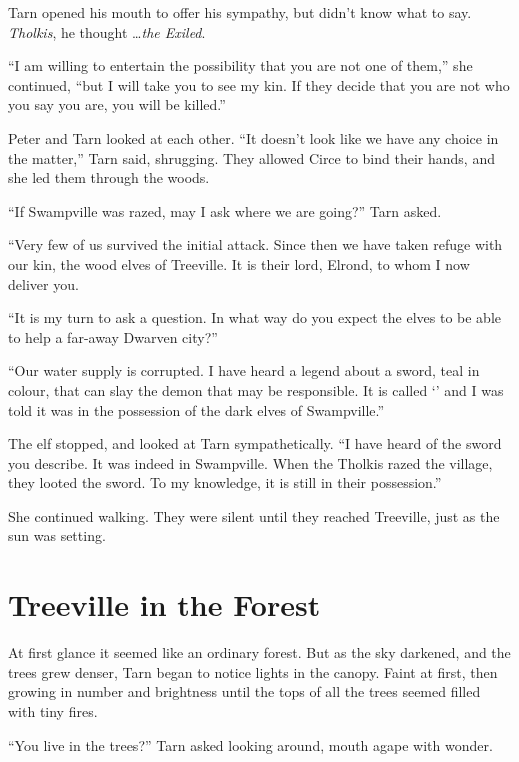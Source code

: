 Tarn opened his mouth to offer his sympathy, but didn't know what to say.  \emph{Tholkis}, he thought \ldots \emph{the Exiled}.

``I am willing to entertain the possibility that you are not one of them,'' she continued, ``but I will take you to see my kin.  If they decide that you are not who you say you are, you will be killed.''

Peter and Tarn looked at each other.  ``It doesn't look like we have any choice in the matter,'' Tarn said, shrugging.  They allowed Circe to bind their hands, and she led them through the woods.

``If Swampville was razed, may I ask where we are going?'' Tarn asked.

``Very few of us survived the initial attack.  Since then we have taken refuge with our kin, the wood elves of Treeville.  It is their lord, Elrond, to whom I now deliver you.

``It is my turn to ask a question.  In what way do you expect the elves to be able to help a far-away Dwarven city?''

``Our water supply is corrupted.  I have heard a legend about a sword, teal in colour, that can slay the demon that may be responsible.  It is called `\kildir' and I was told it was in the possession of the dark elves of Swampville.''

The elf stopped, and looked at Tarn sympathetically.  ``I have heard of the sword you describe.  It was indeed in Swampville.  When the Tholkis razed the village, they looted the sword.  To my knowledge, it is still in their possession.''

She continued walking.  They were silent until they reached Treeville, just as the sun was setting.

\chapter{Treeville in the Forest}

At first glance it seemed like an ordinary forest.  But as the sky darkened, and the trees grew denser, Tarn began to notice lights in the canopy.  Faint at first, then growing in number and brightness until the tops of all the trees seemed filled with tiny fires.

``You live in the trees?'' Tarn asked looking around, mouth agape with wonder.

